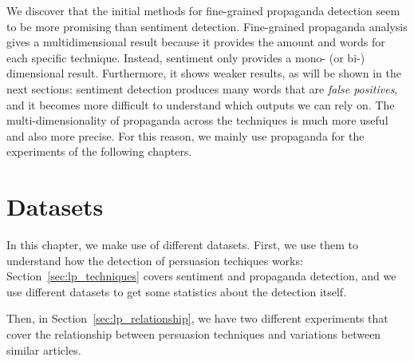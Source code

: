 We discover that
the initial methods for fine-grained propaganda detection seem to be more promising %
than sentiment detection.
Fine-grained propaganda analysis gives a multidimensional result because it provides the amount and words for each specific technique. Instead, sentiment only provides a mono- (or bi-) dimensional result. Furthermore, it shows weaker results, as will be shown in the next sections: sentiment detection produces many words that are \emph{false positives}, and it becomes more difficult to understand which outputs we can rely on.
The multi-dimensionality of propaganda across the techniques is much more useful and also more precise.
For this reason, we mainly use propaganda for the experiments of the following chapters. 


\section{Datasets}
\label{sec:lp_datasets}

In this chapter, we make use of different datasets. 
First, we use them to understand how the detection of persuasion techiques works: Section~\ref{sec:lp_techniques} covers sentiment and propaganda detection, and we use different datasets to get some statistics about the detection itself.

Then, in Section~\ref{sec:lp_relationship}, we have two different experiments that cover the relationship between persuasion techniques and variations between similar articles.

